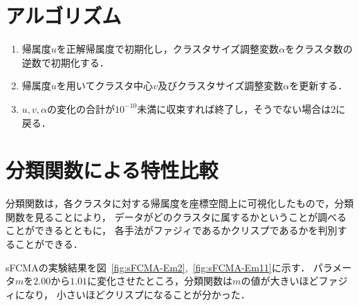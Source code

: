 \documentclass[a4j,12pt,dvipdfmx,oneside]{jsbook}
\theoremstyle{definition}
\begin{document}
 \section{アルゴリズム}\label{sec:artificial_data_algorythm}
  \begin{enumerate}
   \item 帰属度$u$を正解帰属度で初期化し，クラスタサイズ調整変数$\alpha$をクラスタ数の逆数で初期化する．
   \item 帰属度$u$を用いてクラスタ中心$v$及びクラスタサイズ調整変数$\alpha$を更新する．
   \item $u, v, \alpha$の変化の合計が$10^{-10}$未満に収束すれば終了し，そうでない場合は$2$に戻る．
  \end{enumerate}

  \section{分類関数による特性比較}\label{sec:classification_function}

  分類関数は，各クラスタに対する帰属度を座標空間上に可視化したもので，分類関数を見ることにより，
  データがどのクラスタに属するかということが調べることができるとともに，
  各手法がファジィであるかクリスプであるかを判別することができる．
  
  sFCMAの実験結果を図~\ref{fig:sFCMA-Em2},~\ref{fig:sFCMA-Em11}に示す．
  パラメータ$m$を$2.00$から$1.01$に変化させたところ，分類関数は$m$の値が大きいほどファジィになり，
  小さいほどクリスプになることが分かった．
\end{document}
